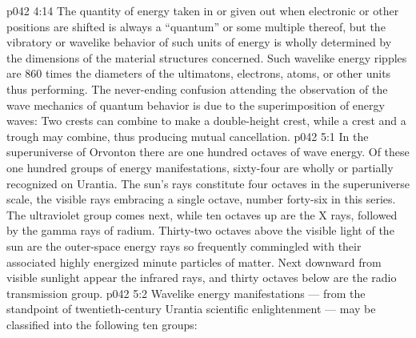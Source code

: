 \vs p042 4:14 The quantity of energy taken in or given out when electronic or other positions are shifted is always a “quantum” or some multiple thereof, but the vibratory or wavelike behavior of such units of energy is wholly determined by the dimensions of the material structures concerned. Such wavelike energy ripples are 860 times the diameters of the ultimatons, electrons, atoms, or other units thus performing. The never\hyp{}ending confusion attending the observation of the wave mechanics of quantum behavior is due to the superimposition of energy waves: Two crests can combine to make a double\hyp{}height crest, while a crest and a trough may combine, thus producing mutual cancellation.
\vs p042 5:1 In the superuniverse of Orvonton there are one hundred octaves of wave energy. Of these one hundred groups of energy manifestations, sixty\hyp{}four are wholly or partially recognized on Urantia. The sun’s rays constitute four octaves in the superuniverse scale, the visible rays embracing a single octave, number forty\hyp{}six in this series. The ultraviolet group comes next, while ten octaves up are the X rays, followed by the gamma rays of radium. Thirty\hyp{}two octaves above the visible light of the sun are the outer\hyp{}space energy rays so frequently commingled with their associated highly energized minute particles of matter. Next downward from visible sunlight appear the infrared rays, and thirty octaves below are the radio transmission group.
\vs p042 5:2 \pc Wavelike energy manifestations --- from the standpoint of twentieth\hyp{}century Urantia scientific enlightenment --- may be classified into the following ten groups:
